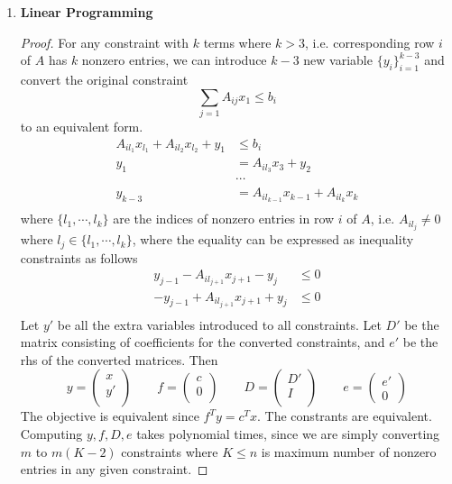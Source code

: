 \documentclass[11pt]{article}
\begin{document}
\begin{enumerate}
\begin{enumerate}
\end{enumerate}

\item \textbf{Linear Programming} 

\begin{proof}
    For any constraint with $k$ terms where $k>3$, i.e. corresponding row $i$ of $A$ has $k$ nonzero entries, we can introduce $k-3$ new variable $\{y_i\}_{i=1}^{k-3}$ and convert the original constraint 
    \[
        \sum_{j=1} A_{ij} x_1 \leq b_i 
    \]
    to an equivalent form. 
    \begin{align*}
        A_{il_1} x_{l_1} + A_{il_2} x_{l_2} + y_1 &\leq b_i  \\
        y_{1} &= A_{il_3} x_3 + y_{2} \\
        &\cdots \\
        y_{k-3} &= A_{il_{k-1}} x_{k-1} + A_{il_{k}} x_k \\ 
    \end{align*}
    where $\{l_1, \cdots, l_k\}$ are the indices of nonzero entries in row $i$ of $A$, i.e. $A_{il_j} \neq 0$ where $l_j \in \{l_1, \cdots, l_k\}$, where the equality can be expressed as inequality constraints as follows 
    \begin{align*}
        y_{j-1} - A_{il_{j+1}} x_{j+1} - y_{j} &\leq 0 \\ 
        - y_{j-1} + A_{il_{j+1}} x_{j+1} + y_{j} &\leq 0 \\ 
    \end{align*}
    Let $y'$ be all the extra variables introduced to all constraints. Let $D'$ be the matrix consisting of coefficients for the converted constraints, and $e'$ be the rhs of the converted matrices. Then 
    \[
        y = 
        \begin{pmatrix}
            x \\
            y' \\
        \end{pmatrix}
        \qquad 
        f = 
        \begin{pmatrix}
            c \\
            0 \\ 
        \end{pmatrix}    
        \qquad 
        D = 
        \begin{pmatrix}
            D' \\
            I \\
        \end{pmatrix}
        \qquad 
        e = 
        \begin{pmatrix}
            e' \\ 
            0
        \end{pmatrix}
    \]
    The objective is equivalent since $f^T y = c^T x$. The constrants are equivalent. Computing $y,f,D,e$ takes polynomial times, since we are simply converting $m$ to $m(K-2)$ constraints where $K \leq n$ is maximum number of nonzero entries in any given constraint.
\end{proof}





\end{enumerate}
\end{document}
